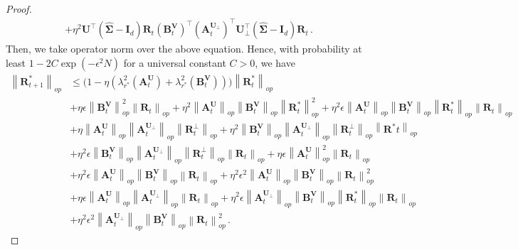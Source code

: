 \begin{proof}
\begin{align*}
        & + \eta^2 \bm U^{\!\top}\left(\widehat{\bm \Sigma}
        - \bm I_d\right) \bm R_t \left(\bm B_t^{\bm V}\right)^{\!\top}\left(\bm A_t^{\bm U_\perp}\right)^{\!\top}\bm U_\perp^{\!\top}\left(\widehat{\bm \Sigma}-\bm I_d\right)\bm R_t\,.
    \end{align*}
    Then, we take operator norm over the above equation. Hence, with probability at least $1- 2C\exp(-\epsilon^2 N)$ for a universal constant $C>0$, we have
    \begin{align*}
        \left\|\bm R^*_{t+1}\right\|_{op} & \leq \bigg(1-\eta\left(\lambda_{r^*}^2\left(\bm A_t^{\bm U}\right)+\lambda_{r^*}^2\left(\bm B_t^{\bm V}\right)\right)\bigg)\left\|\bm R^*_{t}\right\|_{op}\\
        & + \eta \epsilon \left\|\bm B^{\bm V}_{t}\right\|_{op}^2 \left\|\bm R_{t}\right\|_{op} + \eta^2 \left\|\bm A^{\bm U}_{t}\right\|_{op}\left\|\bm B^{\bm V}_{t}\right\|_{op}\left\|\bm R^*_{t}\right\|_{op}^2 + \eta^2 \epsilon \left\|\bm A^{\bm U}_{t}\right\|_{op}\left\|\bm B^{\bm V}_{t}\right\|_{op}\left\|\bm R^*_{t}\right\|_{op}\left\|\bm R_{t}\right\|_{op}\\
        & + \eta \left\|\bm A^{\bm U}_{t}\right\|_{op}\left\|\bm A^{\bm U_\perp}_{t}\right\|_{op}\left\|\bm R^\perp_{t}\right\|_{op}+\eta^2 \left\|\bm B^{\bm V}_{t}\right\|_{op}\left\|\bm A^{\bm U_\perp}_{t}\right\|_{op}\left\|\bm R^\perp_{t}\right\|_{op}\left\|\bm R^*{t}\right\|_{op}\\
        & +\eta^2 \epsilon \left\|\bm B^{\bm V}_{t}\right\|_{op}\left\|\bm A^{\bm U_\perp}_{t}\right\|_{op}\left\|\bm R^\perp_{t}\right\|_{op}\left\|\bm R_{t}\right\|_{op}+\eta \epsilon \left\|\bm A^{\bm U}_{t}\right\|_{op}^2 \left\|\bm R_{t}\right\|_{op}\\
        & + \eta^2 \epsilon \left\|\bm A^{\bm U}_{t}\right\|_{op}\left\|\bm B^{\bm V}_{t}\right\|_{op} \left\|\bm R_{t}\right\|_{op} + \eta^2 \epsilon^2 \left\|\bm A^{\bm U}_{t}\right\|_{op}\left\|\bm B^{\bm V}_{t}\right\|_{op} \left\|\bm R_{t}\right\|_{op}^2\\
        & + \eta \epsilon \left\|\bm A^{\bm U}_{t}\right\|_{op}\left\|\bm A^{\bm U_\perp}_{t}\right\|_{op}\left\|\bm R_{t}\right\|_{op}+\eta^2 \epsilon \left\|\bm A^{\bm U_\perp}_{t}\right\|_{op}\left\|\bm B^{\bm V}_{t}\right\|_{op}\left\|\bm R^*_{t}\right\|_{op}\left\|\bm R_{t}\right\|_{op}\\
        & + \eta^2 \epsilon^2 \left\|\bm A^{\bm U_\perp}_{t}\right\|_{op}\left\|\bm B^{\bm V}_{t}\right\|_{op} \left\|\bm R_{t}\right\|_{op}^2\,.
    \end{align*}

\end{proof}
